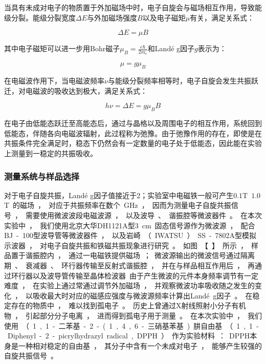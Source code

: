 \documentclass{thuemp}
\begin{document}
当具有未成对电子的物质置于外加磁场中时，电子自旋会与磁场相互作用，导致能级分裂。能级分裂宽度$\Delta E$与外加磁场强度$B$以及电子磁矩$\mu$有关，满足关系式：

\begin{equation}
\Delta E = \mu B
\end{equation}

其中电子磁矩可以进一步用Bohr磁子$\mu_B = \frac{e\hbar}{2m_e}$和Landé g因子$g$表示为：

\begin{equation}
\mu = g \mu_B
\end{equation}

在电磁波作用下，当电磁波频率$\nu$与能级分裂频率相等时，电子自旋会发生共振跃迁，对电磁波的吸收达到极大，满足关系式：

\begin{equation}
h \nu  = \Delta E = g \mu_B B
\end{equation}

在电子由低能态跃迁至高能态后，通过与晶格以及周围电子的相互作用，系统回到低能态，伴随各向电磁波辐射，此过程称为弛豫。由于弛豫作用的存在，即使是在共振条件完全满足时，稳态下仍然会有一定数量的电子处于低能态，因此能在实验上测量到一稳定的共振吸收。

\subsubsection{测量系统与样品选择}

对于电子自旋共振，Landé g因子值接近于2；实验室中电磁铁一般可产生$0.1$\si{\tesla}~$1.0$\si\tesla 的磁场，对应于共振频率在数个\si{\giga\hertz}，因而为测量电子自旋共振信号，需要使用微波波段电磁波源，以及波导、谐振腔等微波器件。

在本次实验中，我们使用北京大华DH1121A型3\si{\centi\meter}固态信号源作为微波源，配合BJ-100型波导管等微波器件，以及岩崎（IWATSU）SS-7802A型模拟示波器，对电子自旋共振和铁磁共振现象进行研究。如图【】所示，样品置于谐振腔内，通过一电磁铁提供磁场；微波源输出的微波信号通过隔离期、衰减器、环行器传输至反射式谐振腔，并在与样品相互作用后，再通过环行器以及波导管传输至晶体检波器

由于产生微波的元件本身频率调节有一定难度，在实验上通过常通过调节外加磁场，并观察微波功率吸收随之发生的变化，以吸收最大时对应的磁感应强度与微波源频率计算出Landé g因子。

在稳定存在的物质中，难以找到孤电子。历史上曾通过X射线照射小分子有机物，引起部分分子电离，进而得到孤电子用于测量。在本次实验中，我们使用（1,1-二苯基-2-(1,4,6-三硝基苯基)肼自由基（1,1-Diphenyl-2-picrylhydrazyl radical, DPPH）作为实验材料：DPPH本身是一种相对稳定的自由基，其分子中含有一个未成对电子，能够产生较强的自旋共振信号。
\end{document}
